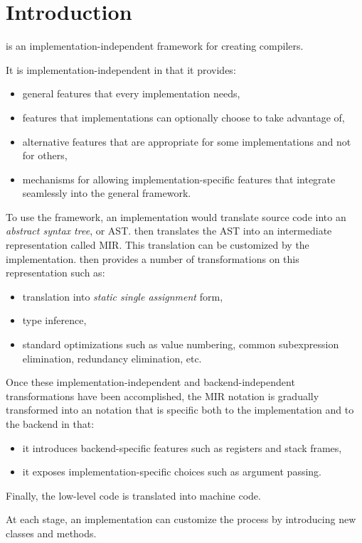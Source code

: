 \chapter{Introduction}
%

\sysname{} is an implementation-independent framework for creating
\cl{} compilers. 

It is implementation-independent in that it provides:

\begin{itemize}
\item general features that every implementation needs,
\item features that implementations can optionally choose to take
  advantage of, 
\item alternative features that are appropriate for some
  implementations and not for others,
\item mechanisms for allowing implementation-specific features that
  integrate seamlessly into the general framework.
\end{itemize}

To use the framework, an implementation would translate source code
into an \emph{abstract syntax tree}, or AST.
\sysname{} then translates the AST into an intermediate representation
called MIR.  
This translation can be customized by the implementation.
\sysname{} then provides a number of transformations on this
representation such as:

\begin{itemize}
\item translation into \emph{static single assignment} form,
\item type inference,
\item standard optimizations such as value numbering, common
  subexpression elimination, redundancy elimination, etc.
\end{itemize}

Once these implementation-independent and backend-independent
transformations have been accomplished, the MIR notation is gradually
transformed into an notation that is specific both to the
implementation and to the backend in that:

\begin{itemize}
\item it introduces backend-specific features such as registers and
  stack frames,
\item it exposes implementation-specific choices such as argument
  passing.
\end{itemize}

Finally, the low-level code is translated into machine code.

At each stage, an implementation can customize the process by
introducing new classes and methods. 
